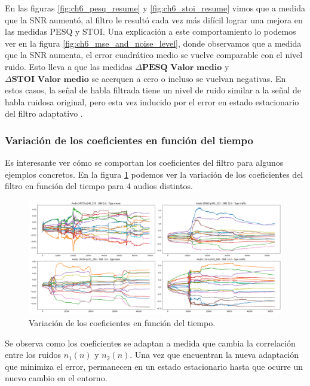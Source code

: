En las figuras \ref{fig:ch6_pesq_resume} y \ref{fig:ch6_stoi_resume} vimos que a medida que la SNR aumentó, al filtro le resultó cada vez más difícil lograr una mejora en las medidas PESQ y STOI. Una explicación a este comportamiento lo podemos ver en la figura \ref{fig:ch6_mse_and_noise_level}, donde observamos que a medida que la SNR aumenta, el error cuadrático medio se vuelve comparable con el nivel ruido. Esto lleva a que las medidas $\Delta \textbf{PESQ Valor medio}$ y $\Delta \textbf{STOI Valor medio}$ se acerquen a cero o incluso se vuelvan negativas. En estos casos, la señal de habla filtrada tiene un nivel de ruido similar a la señal de habla ruidosa original, pero esta vez inducido por el error en estado estacionario del filtro adaptativo \cite{fundamentals_of_adaptive_filtering}.

\subsubsection{Variación de los coeficientes en función del tiempo}

Es interesante ver cómo se comportan los coeficientes del filtro para algunos ejemplos concretos. En la figura \ref{fig:ch6_variacion_temporal_de_coeficientes}  podemos ver la variación de los coeficientes del filtro en función del tiempo para 4 audios distintos. 

\begin{figure}
	\centering
	\centerline{\includegraphics[scale=0.35]{images/ch6/af/weights/weights.png}}
	\caption{Variación de los coeficientes en función del tiempo.}
	\label{fig:ch6_variacion_temporal_de_coeficientes}
\end{figure}

Se observa como los coeficientes se adaptan a medida que cambia la correlación entre los ruidos $n_1(n)$ y $n_2(n)$. Una vez que encuentran la nueva adaptación que minimiza el error, permanecen en un estado estacionario hasta que ocurre un nuevo cambio en el entorno.

